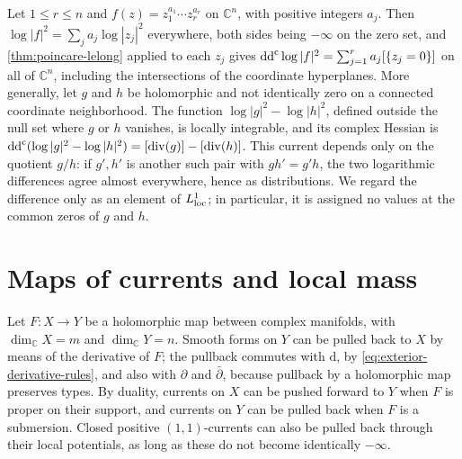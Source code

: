 \begin{example}\label{ex:poincare-lelong-products}
Let $1\leq r\leq n$ and $f(z)=z_1^{a_1}\cdots z_r^{a_r}$ on $\mathbb C^n$, with positive integers $a_j$. Then $\log|f|^2=\sum_ja_j\log|z_j|^2$ everywhere, both sides being $-\infty$ on the zero set, and \cref{thm:poincare-lelong} applied to each $z_j$ gives $\mathrm{dd}^{\mathrm{c}}\log|f|^2=\sum_{j=1}^r a_j[\{z_j=0\}]$ on all of $\mathbb C^n$, including the intersections of the coordinate hyperplanes. More generally, let $g$ and $h$ be holomorphic and not identically zero on a connected coordinate neighborhood. The function $\log|g|^2-\log|h|^2$, defined outside the null set where $g$ or $h$ vanishes, is locally integrable, and its complex Hessian is $\mathrm{dd}^{\mathrm{c}}(\log|g|^2-\log|h|^2)=[\operatorname{div}(g)]-[\operatorname{div}(h)]$. This current depends only on the quotient $g/h$: if $g',h'$ is another such pair with $gh'=g'h$, the two logarithmic differences agree almost everywhere, hence as distributions. We regard the difference only as an element of $L^1_{\mathrm{loc}}$; in particular, it is assigned no values at the common zeros of $g$ and $h$.
\end{example}

\section{Maps of currents and local mass}
\label{sec:current-maps}

Let $F\colon X\to Y$ be a holomorphic map between complex manifolds, with $\dim_{\mathbb C}X=m$ and $\dim_{\mathbb C}Y=n$. Smooth forms on $Y$ can be pulled back to $X$ by means of the derivative of $F$; the pullback commutes with $\mathrm d$, by \eqref{eq:exterior-derivative-rules}, and also with $\partial$ and $\bar\partial$, because pullback by a holomorphic map preserves types. By duality, currents on $X$ can be pushed forward to $Y$ when $F$ is proper on their support, and currents on $Y$ can be pulled back when $F$ is a submersion. Closed positive $(1,1)$-currents can also be pulled back through their local potentials, as long as these do not become identically $-\infty$.

